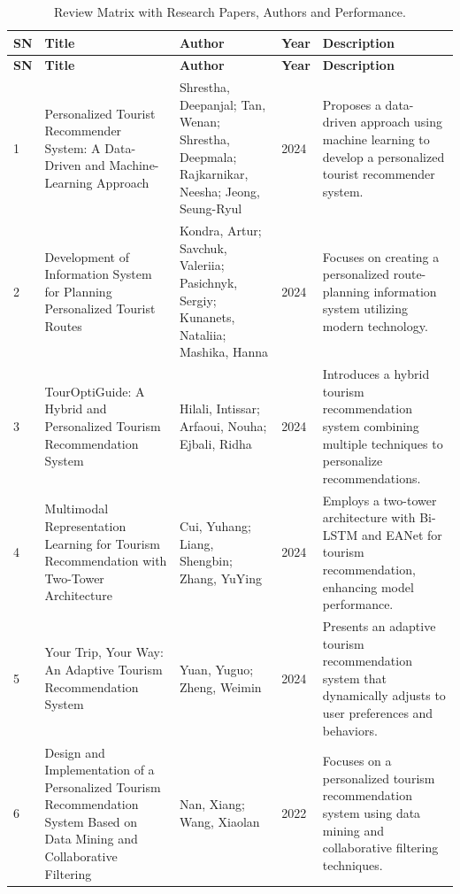 \begin{longtable}{|p{0.5cm}|p{4cm}|p{4cm}|p{0.8cm}|p{5cm}|}
\caption{Review Matrix with Research Papers, Authors and Performance.\label{Research Papers with their authors}} \\
\hline
\textbf{SN} & \textbf{Title} & \textbf{Author} & \textbf{Year} & \textbf{Description} \\
\hline
\endfirsthead

\hline
\textbf{SN} & \textbf{Title} & \textbf{Author} & \textbf{Year} & \textbf{Description} \\
\hline
\endhead

\hline
\endfoot

\hline
\endlastfoot

1 & Personalized Tourist Recommender System: A Data-Driven and Machine-Learning Approach & Shrestha, Deepanjal; Tan, Wenan; Shrestha, Deepmala; Rajkarnikar, Neesha; Jeong, Seung-Ryul & 2024 & Proposes a data-driven approach using machine learning to develop a personalized tourist recommender system. \\
\hline
2 & Development of Information System for Planning Personalized Tourist Routes & Kondra, Artur; Savchuk, Valeriia; Pasichnyk, Sergiy; Kunanets, Nataliia; Mashika, Hanna & 2024 & Focuses on creating a personalized route-planning information system utilizing modern technology. \\
\hline
3 & TourOptiGuide: A Hybrid and Personalized Tourism Recommendation System & Hilali, Intissar; Arfaoui, Nouha; Ejbali, Ridha & 2024 & Introduces a hybrid tourism recommendation system combining multiple techniques to personalize recommendations. \\
\hline
4 & Multimodal Representation Learning for Tourism Recommendation with Two-Tower Architecture & Cui, Yuhang; Liang, Shengbin; Zhang, YuYing & 2024 & Employs a two-tower architecture with Bi-LSTM and EANet for tourism recommendation, enhancing model performance. \\
\hline
5 & Your Trip, Your Way: An Adaptive Tourism Recommendation System & Yuan, Yuguo; Zheng, Weimin & 2024 & Presents an adaptive tourism recommendation system that dynamically adjusts to user preferences and behaviors. \\
\hline
6 & Design and Implementation of a Personalized Tourism Recommendation System Based on Data Mining and Collaborative Filtering & Nan, Xiang; Wang, Xiaolan & 2022 & Focuses on a personalized tourism recommendation system using data mining and collaborative filtering techniques. \\

\end{longtable}
